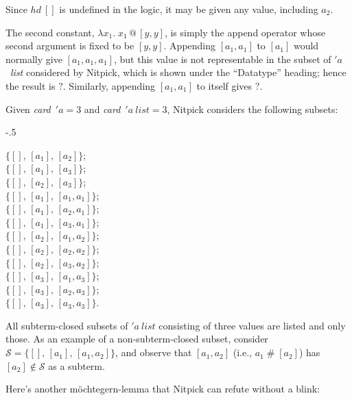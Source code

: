 \documentclass[a4paper,12pt]{article}
\def\unk{{?}}
\begin{document}
Since $\mathit{hd}~[]$ is undefined in the logic, it may be given any value,
including $a_2$.

The second constant, $\lambda x_1.\; x_1 \mathbin{@} [y, y]$, is simply the
append operator whose second argument is fixed to be $[y, y]$. Appending $[a_1,
a_1]$ to $[a_1]$ would normally give $[a_1, a_1, a_1]$, but this value is not
representable in the subset of $'a$~\textit{list} considered by Nitpick, which
is shown under the ``Datatype'' heading; hence the result is $\unk$. Similarly,
appending $[a_1, a_1]$ to itself gives $\unk$.

Given \textit{card}~$'a = 3$ and \textit{card}~$'a~\textit{list} = 3$, Nitpick
considers the following subsets:

\kern-.5\smallskipamount %

\prew
\begin{multicols}{3}
$\{[],\, [a_1],\, [a_2]\}$; \\
$\{[],\, [a_1],\, [a_3]\}$; \\
$\{[],\, [a_2],\, [a_3]\}$; \\
$\{[],\, [a_1],\, [a_1, a_1]\}$; \\
$\{[],\, [a_1],\, [a_2, a_1]\}$; \\
$\{[],\, [a_1],\, [a_3, a_1]\}$; \\
$\{[],\, [a_2],\, [a_1, a_2]\}$; \\
$\{[],\, [a_2],\, [a_2, a_2]\}$; \\
$\{[],\, [a_2],\, [a_3, a_2]\}$; \\
$\{[],\, [a_3],\, [a_1, a_3]\}$; \\
$\{[],\, [a_3],\, [a_2, a_3]\}$; \\
$\{[],\, [a_3],\, [a_3, a_3]\}$.
\end{multicols}
\postw

\smallskipamount %

All subterm-closed subsets of $'a~\textit{list}$ consisting of three values
are listed and only those. As an example of a non-subterm-closed subset,
consider $\mathcal{S} = \{[],\, [a_1],\,\allowbreak [a_1, a_2]\}$, and observe
that $[a_1, a_2]$ (i.e., $a_1 \mathbin{\#} [a_2]$) has $[a_2] \notin
\mathcal{S}$ as a subterm.

Here's another m\"ochtegern-lemma that Nitpick can refute without a blink:
\end{document}
